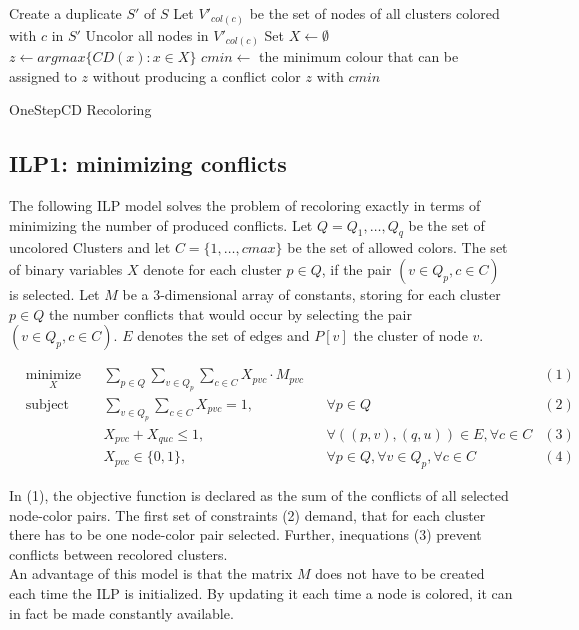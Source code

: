 \begin{algorithm}[h]
Create a duplicate $S'$ of $S$\;
Let $V'_{col(c)}$ be the set of nodes of all clusters colored with $c$ in $S'$\;
Uncolor all nodes in $V'_{col(c)}$\;
 {
  Set $X \gets \emptyset $\;
  $z \gets argmax\{CD(x) : x \in X \}$\;
  $cmin \gets$ the minimum colour that can be assigned to $z$ without producing a conflict\;
  color $z$ with $cmin$\;
}
\;
\caption{OneStepCD Recoloring}
\label{algo:osdc2}
\end{algorithm}


\subsection{ILP1: minimizing conflicts}

The following ILP model solves the problem of recoloring exactly in terms of minimizing the number of produced conflicts. Let $Q = {Q_1,\ldots,Q_q}$ be the set of uncolored Clusters and let $C=\{1,\ldots,cmax\}$ be the set of allowed colors. The set of binary variables $X$ denote for each cluster $p \in Q$, if the pair $(v \in Q_p, c \in C)$ is selected. Let $M$ be a 3-dimensional array of constants, storing for each cluster $p \in Q$ the number conflicts that would occur by selecting the pair $(v \in Q_p, c \in C)$. $E$ denotes the set of edges and $P[v]$ the cluster of node $v$.

\begin{equation*}
\begin{aligned}
& \underset{X}{\text{minimize}} && \sum_{p \in Q}\sum_{v \in Q_p}\sum_{c \in C} X_{pvc} \cdot M_{pvc}                    &&&(1)\\
& \text{subject to} && \sum_{v \in Q_p}\sum_{c \in C} X_{pvc}=1, && \forall p \in Q    &(2)\\
&&& X_{pvc}+X_{quc} \leq 1, && \forall ((p,v),(q,u)) \in E, \forall c \in C     &(3)\\
&&& X_{pvc} \in \{0,1\}, && \forall p \in Q, \forall v \in Q_p, \forall c \in C         &(4)
\end{aligned}
\end{equation*}

In (1), the objective function is declared as the sum of the conflicts of all selected node-color pairs. The first set of constraints (2) demand, that for each cluster there has to be one node-color pair selected. Further, inequations (3) prevent conflicts between recolored clusters.\\
An advantage of this model is that the matrix $M$ does not have to be created each time the ILP is initialized. By updating it each time a node is colored, it can in fact be made constantly available.

